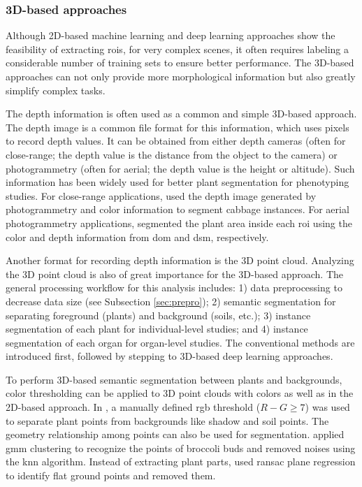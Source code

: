 \subsubsection{3D-based approaches}

Although 2D-based machine learning and deep learning approaches show the feasibility of extracting \gls{roi}s, for very complex scenes, it often requires labeling a considerable number of training sets to ensure better performance. The 3D-based approaches can not only provide more morphological information but also greatly simplify complex tasks.

The depth information is often used as a common and simple 3D-based approach. The depth image is a common file format for this information, which uses pixels to record depth values. It can be obtained from either depth cameras (often for close-range; the depth value is the distance from the object to the camera) or photogrammetry (often for aerial; the depth value is the height or altitude). Such information has been widely used for better plant segmentation for phenotyping studies. For close-range applications, \citep{luling_using_2021} used the depth image generated by photogrammetry and color information to segment cabbage instances. For aerial photogrammetry applications, \citet{guo_fieldbased_2020} segmented the plant area inside each \gls{roi} using the color and depth information from \gls{dom} and \gls{dsm}, respectively.

Another format for recording depth information is the 3D point cloud. Analyzing the 3D point cloud is also of great importance for the 3D-based approach. The general processing workflow for this analysis includes: 1) data preprocessing to decrease data size (see Subsection \ref{sec:prepro}); 2) semantic segmentation for separating foreground (plants) and background (soils, etc.); 3) instance segmentation of each plant for individual-level studies; and 4) instance segmentation of each organ for organ-level studies. The conventional methods are introduced first, followed by stepping to 3D-based deep learning approaches.

To perform 3D-based semantic segmentation between plants and backgrounds, color thresholding can be applied to 3D point clouds with colors as well as in the 2D-based approach. In \citet[Fig.~3]{xiao_image-based_2020}, a manually defined \gls{rgb} threshold ($R-G\geq7$) was used to separate plant points from backgrounds like shadow and soil points. The geometry relationship among points can also be used for segmentation. \citet{ge_method_2019} applied \gls{gmm} clustering to recognize the points of broccoli buds and removed noises using the \gls{knn} algorithm. Instead of extracting plant parts, \citet{garrido_3d_2015} used \gls{ransac} plane regression to identify flat ground points and removed them.


